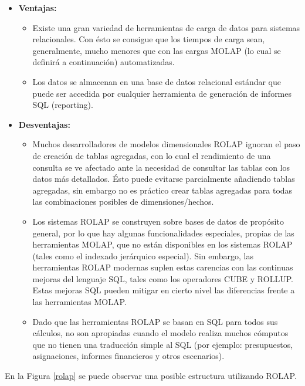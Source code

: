\documentclass[a4paper,11pt]{article}
\begin{document}
    \begin{itemize}
      \item \textbf{Ventajas:}
        \begin{itemize}
          \item Existe una gran variedad de herramientas de carga de datos para sistemas relacionales. Con ésto se consigue que los tiempos de carga
          sean, generalmente, mucho menores que con las cargas MOLAP (lo cual se definirá a continuación) automatizadas.
          \item Los datos se almacenan en una base de datos relacional estándar que puede ser accedida por cualquier herramienta de generación de
          informes SQL (reporting).
        \end{itemize}
      \item \textbf{Desventajas:}
        \begin{itemize}
          \item Muchos desarrolladores de modelos dimensionales ROLAP ignoran el paso de creación de tablas agregadas, con lo cual el rendimiento de
          una consulta se ve afectado ante la necesidad de consultar las tablas con los datos más detallados. Ésto puede evitarse parcialmente
          añadiendo tablas agregadas, sin embargo no es práctico crear tablas agregadas para todas las combinaciones posibles de dimensiones/hechos.
          \item Los sistemas ROLAP se construyen sobre bases de datos de propósito general, por lo que hay algunas funcionalidades especiales, propias
          de las herramientas MOLAP, que no están disponibles en los sistemas ROLAP (tales como el indexado jerárquico especial). Sin embargo, las
          herramientas ROLAP modernas suplen estas carencias con las continuas mejoras del lenguaje SQL, tales como los operadores CUBE y ROLLUP.
          Estas mejoras SQL pueden mitigar en cierto nivel las diferencias frente a las herramientas MOLAP.
          \item Dado que las herramientas ROLAP se basan en SQL para todos sus cálculos, no son apropiadas cuando el modelo realiza muchos cómputos que
          no tienen una traducción simple al SQL (por ejemplo: presupuestos, asignaciones, informes financieros y otros escenarios).
        \end{itemize}
    \end{itemize}
    
    En la Figura \ref{rolap} se puede observar una posible estructura utilizando ROLAP.
    
\end{document}
